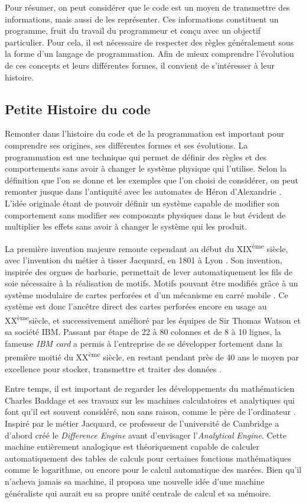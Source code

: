\documentclass[12pt]{article} %
\newcommand{\ts}{\textsuperscript} %
\begin{document}
Pour résumer, on peut considérer que le code est un moyen de transmettre des informations, mais aussi de les représenter. Ces informations constituent un programme, fruit du travail du programmeur et conçu avec un objectif particulier. Pour cela, il est nécessaire de respecter des règles généralement sous la forme d'un langage de programmation. Afin de mieux comprendre l'évolution de ces concepts et leurs différentes formes, il convient de s'intéresser à leur histoire.

\subsection{Petite Histoire du code}
Remonter dans l'histoire du code et de la programmation est important pour comprendre ses origines, ses différentes formes et ses évolutions. La programmation est une technique qui permet de définir des règles et des comportements sans avoir à changer le système physique qui l'utilise. Selon la définition que l'on se donne et les exemples que l'on choisi de considérer, on peut remonter jusque dans l'antiquité avec les automates de Héron d'Alexandrie \cite{View_all_of_Hansels_posts2018-uw}. L'idée originale étant de pouvoir définir un système capable de modifier son comportement sans modifier ses composants physiques dans le but évident de multiplier les effets sans avoir à changer le système qui les produit.

La première invention majeure remonte cependant au début du XIX\ts{ème} siècle, avec l'invention du métier à tisser Jacquard, en 1801 à Lyon \cite{RDigest1982}. Son invention, inspirée des orgues de barbarie, permettait de lever automatiquement les fils de soie nécessaire à la réalisation de motifs. Motifs pouvant être modifiés grâce à un système modulaire de cartes perforées et d'un mécanisme en carré mobile \cite{noauthor_2009-bf}. Ce système est donc l'ancêtre direct des cartes perforées encore en usage au XX\ts{ème}siècle, et successivement amélioré par les équipes de Sir Thomas Watson et sa société IBM. Passant par étape de 22 à 80 colonnes et de 8 à 10 lignes, la fameuse \textit{IBM card} a permis à l'entreprise de se développer fortement dans la première moitié du XX\ts{ème} siècle, en restant pendant près de 40 ans le moyen par excellence pour stocker, transmettre et traiter des données \cite{noauthor_2012-xq}.

Entre temps, il est important de regarder les développements du mathématicien Charles Baddage et ses travaux sur les machines calculatoires et analytiques qui font qu'il est souvent considéré, non sans raison, comme le père de l'ordinateur \cite{Copeland2020-my}. Inspiré par le métier Jacquard, ce professeur de l'université de Cambridge a d'abord créé le \textit{Difference Engine} avant d'envisager l'\textit{Analytical Engine}. Cette machine entièrement analogique est théoriquement capable de calculer automatiquement des tables de calculs pour certaines fonctions mathématiques comme le logarithme, ou encore pour le calcul automatique des marées. Bien qu'il n'acheva jamais sa machine, il proposa une nouvelle idée d'une machine généraliste qui aurait eu sa propre unité centrale de calcul et sa mémoire. 
\end{document}
